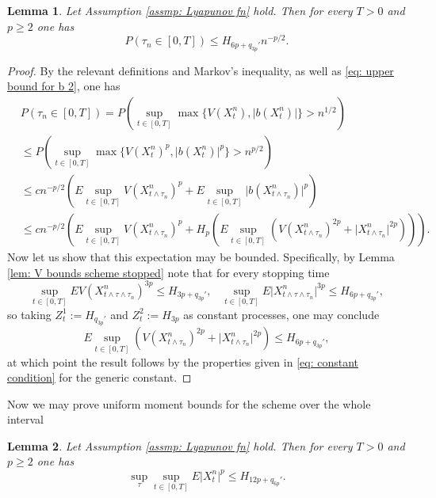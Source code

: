 \documentclass{article}
\newtheorem{lemma}{Lemma}
\begin{document}
\begin{lemma}\label{lemma: decay of stopping time}
      Let Assumption \ref{assmp: Lyapunov fn} hold.  Then for every $T>0$ and $p\geq 2$ one has
    \begin{equation}
      P(\tau_n\in [0,T])\leq H_{6p+q_{3p}'}n^{-p/2}.
    \end{equation}
\end{lemma}
\begin{proof}
    By the relevant definitions and Markov's inequality, as well as \eqref{eq: upper bound for b 2}, one has
    \begin{align}
    &P(\tau_n\in [0,T])=P(\sup_{t\in [0,T]}\max\{V(X^n_t), \lvert b(X^n_t)\rvert\}>n^{1/2}) \nonumber \\
    &\leq P(\sup_{t\in [0,T]}\max\{V(X^n_t)^p, \lvert b(X^n_t)\rvert^p\}>n^{p/2})\nonumber \\
    &\leq cn^{-p/2}(E\sup_{t\in [0,T]}V(X^n_{t\wedge \tau_n})^p+E\sup_{t\in [0,T]}\lvert b(X^n_{t\wedge \tau_n})\rvert^p)\nonumber \\
    &\leq cn^{-p/2}(E\sup_{t\in [0,T]}V(X^n_{t\wedge \tau_n})^p+H_p(E\sup_{t\in [0,T]}(V(X^n_{t\wedge \tau_n})^{2p}+\lvert X^n_{t\wedge \tau_n}\rvert^{2p}))).
    \end{align}
Now let us show that this expectation may be bounded. Specifically, by Lemma \ref{lem: V bounds scheme stopped} note that for every stopping time 
\begin{equation}
\sup_{t\in [0,T]}EV(X^n_{t\wedge\tau\wedge \tau_n})^{3p}\leq H_{3p+q_{3p}'},\;\;\;\sup_{t\in [0,T]}E\lvert X^n_{t\wedge\tau\wedge \tau_n}\rvert^{3p}\leq H_{6p+q_{3p}'},
\end{equation}
so taking $Z^1_t:=H_{q_{3p}'}$ and $Z^2_t:=H_{3p}$ as constant processes, one may conclude
\begin{equation}
  E\sup_{t\in [0,T]}(V(X^n_{t\wedge \tau_n})^{2p}+\lvert X^n_{t\wedge \tau_n}\rvert^{2p})\leq H_{6p+q_{3p}'},
\end{equation}
at which point the result follows by the properties given in \eqref{eq: constant condition} for the generic constant.
\end{proof}
Now we may prove uniform moment bounds for the scheme over the whole interval
\begin{lemma}\label{lem: moment bounds scheme uniform full intevral}
    Let Assumption \ref{assmp: Lyapunov fn} hold.  Then for every $T>0$ and $p\geq 2$ one has
    \begin{equation}
      \sup_{\tau}\sup_{t\in [0,T]} E\lvert X^n_t \rvert^p\leq H_{12p+q_{6p}'}.
    \end{equation}
\end{lemma}
\end{document}
